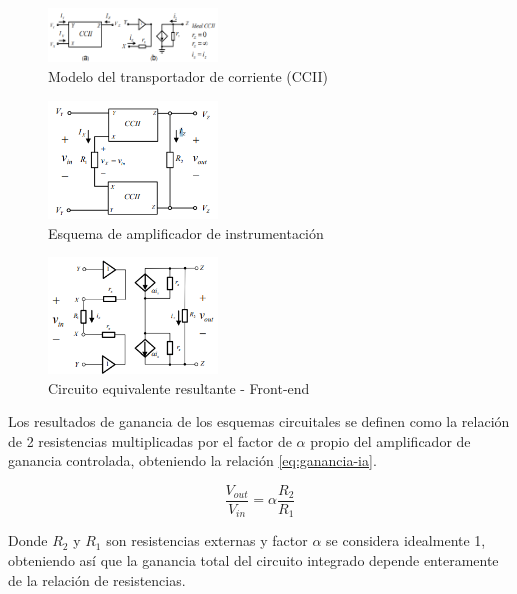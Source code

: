 \documentclass[conference]{IEEEtran}
\begin{document}
	\begin{figure}[h]
		\centering
		\includegraphics[width=0.4\textwidth]{media/transportador-corriente}
		\caption{Modelo del transportador de corriente (CCII)}
		\label{fig:transportador-corriente}
	\end{figure}
	
	\begin{figure}[h]
		\centering
		\includegraphics[width=0.4\textwidth]{media/ia-propuesto}
		\caption{Esquema de amplificador de instrumentación}
		\label{fig:ia-propuesto}
	\end{figure}
	
	\begin{figure}[h]
		\centering
		\includegraphics[width=0.4\textwidth]{media/circuito-equivalente}
		\caption{Circuito equivalente resultante - Front-end}
		\label{fig:circuito-equivalente}
	\end{figure}
	
	Los resultados de ganancia de los esquemas circuitales se definen como la relación de 2 resistencias multiplicadas por el factor de $\alpha$ propio del amplificador de ganancia controlada, obteniendo la relación \ref{eq:ganancia-ia}.
	
	\begin{equation}
		\frac{V_{out}}{V_{in}} = \alpha\frac{R_2}{R_1}
		\label{eq:ganancia-ia}
	\end{equation}
	
	Donde $R_2$ y $R_1$ son resistencias externas y factor $\alpha$ se considera idealmente 1, obteniendo así que la ganancia total del circuito integrado depende enteramente de la relación de resistencias.
	
\end{document}

